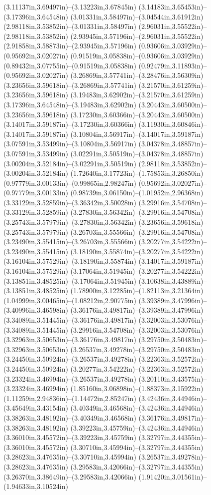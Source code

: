 (3.11137in,3.69497in)--(3.13223in,3.67845in) (3.14183in,3.65453in)--(3.17396in,3.64548in) (3.01331in,3.58497in)--(3.04544in,3.61912in) (2.98118in,3.53852in)--(3.01331in,3.58497in) (2.96031in,3.55522in)--(2.98118in,3.53852in) (2.93945in,3.57196in)--(2.96031in,3.55522in) (2.91858in,3.58873in)--(2.93945in,3.57196in) (0.93606in,3.03929in)--(0.95692in,3.02027in) (0.91519in,3.05838in)--(0.93606in,3.03929in) (0.89432in,3.07755in)--(0.91519in,3.05838in) (0.92479in,3.11893in)--(0.95692in,3.02027in) (3.26869in,3.57741in)--(3.28476in,3.56309in) (3.23656in,3.59618in)--(3.26869in,3.57741in) (3.21570in,3.61259in)--(3.23656in,3.59618in) (3.19483in,3.62902in)--(3.21570in,3.61259in) (3.17396in,3.64548in)--(3.19483in,3.62902in) (3.20443in,3.60500in)--(3.23656in,3.59618in) (3.17230in,3.60366in)--(3.20443in,3.60500in) (3.14017in,3.59187in)--(3.17230in,3.60366in) (3.11930in,3.60846in)--(3.14017in,3.59187in) (3.10804in,3.56917in)--(3.14017in,3.59187in) (3.07591in,3.53499in)--(3.10804in,3.56917in) (3.04378in,3.48857in)--(3.07591in,3.53499in) (3.02291in,3.50519in)--(3.04378in,3.48857in) (3.00204in,3.52184in)--(3.02291in,3.50519in) (2.98118in,3.53852in)--(3.00204in,3.52184in) (1.72640in,3.17723in)--(1.75853in,3.26850in) (0.97779in,3.00133in)--(0.99865in,2.98247in) (0.95692in,3.02027in)--(0.97779in,3.00133in) (0.98739in,3.06150in)--(1.01952in,2.96368in) (3.33129in,3.52859in)--(3.36342in,3.50028in) (3.29916in,3.54708in)--(3.33129in,3.52859in) (3.27830in,3.56342in)--(3.29916in,3.54708in) (3.25743in,3.57979in)--(3.27830in,3.56342in) (3.23656in,3.59618in)--(3.25743in,3.57979in) (3.26703in,3.55566in)--(3.29916in,3.54708in) (3.23490in,3.55415in)--(3.26703in,3.55566in) (3.20277in,3.54222in)--(3.23490in,3.55415in) (3.18190in,3.55874in)--(3.20277in,3.54222in) (3.16104in,3.57529in)--(3.18190in,3.55874in) (3.14017in,3.59187in)--(3.16104in,3.57529in) (3.17064in,3.51945in)--(3.20277in,3.54222in) (3.13851in,3.48525in)--(3.17064in,3.51945in) (3.10638in,3.43889in)--(3.13851in,3.48525in) (1.78900in,3.12285in)--(1.82113in,3.21364in) (1.04999in,3.00465in)--(1.08212in,2.90775in) (3.39389in,3.47996in)--(3.40996in,3.46598in) (3.36176in,3.49817in)--(3.39389in,3.47996in) (3.34089in,3.51445in)--(3.36176in,3.49817in) (3.32003in,3.53076in)--(3.34089in,3.51445in) (3.29916in,3.54708in)--(3.32003in,3.53076in) (3.32963in,3.50653in)--(3.36176in,3.49817in) (3.29750in,3.50483in)--(3.32963in,3.50653in) (3.26537in,3.49278in)--(3.29750in,3.50483in) (3.24450in,3.50924in)--(3.26537in,3.49278in) (3.22363in,3.52572in)--(3.24450in,3.50924in) (3.20277in,3.54222in)--(3.22363in,3.52572in) (3.23324in,3.46994in)--(3.26537in,3.49278in) (3.20110in,3.43575in)--(3.23324in,3.46994in) (1.85160in,3.06898in)--(1.88373in,3.15922in) (1.11259in,2.94836in)--(1.14472in,2.85247in) (3.42436in,3.44946in)--(3.45649in,3.43154in) (3.40349in,3.46568in)--(3.42436in,3.44946in) (3.38263in,3.48192in)--(3.40349in,3.46568in) (3.36176in,3.49817in)--(3.38263in,3.48192in) (3.39223in,3.45759in)--(3.42436in,3.44946in) (3.36010in,3.45572in)--(3.39223in,3.45759in) (3.32797in,3.44355in)--(3.36010in,3.45572in) (3.30710in,3.45994in)--(3.32797in,3.44355in) (3.28623in,3.47635in)--(3.30710in,3.45994in) (3.26537in,3.49278in)--(3.28623in,3.47635in) (3.29583in,3.42066in)--(3.32797in,3.44355in) (3.26370in,3.38649in)--(3.29583in,3.42066in) (1.91420in,3.01561in)--(1.94633in,3.10524in) 